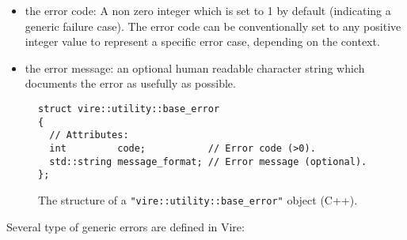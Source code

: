 \begin{itemize}

\item the error code: A non zero  integer which is set to 1 by default
  (indicating  a  generic  failure  case).   The  error  code  can  be
  conventionally  set to  any positive  integer value  to represent  a
  specific error case, depending on the context.

\item the error  message: an optional human  readable character string
  which documents the error as usefully as possible.

\end{itemize}

\begin{figure}[h]
\vskip 10pt
\small
\begin{Verbatim}[frame=single,xleftmargin=0.cm,label=\fbox{C++}]
struct vire::utility::base_error
{
  // Attributes:
  int         code;           // Error code (>0).
  std::string message_format; // Error message (optional).
};
\end{Verbatim}
\normalsize
\caption{The structure of a \texttt{"vire::utility::base\_error"} object
  (C++).}
\label{fig-app-payload-base_error}
\end{figure}



Several type of generic errors are defined in Vire:


\begin{center}
\end{center}


